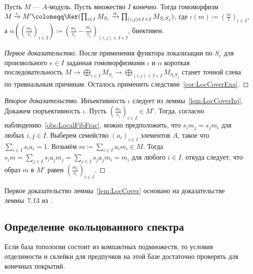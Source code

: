 \documentclass[
	extrafontsizes,
	11pt,
	hyphens,
]{memoir}
\begin{document}
\begin{lemma} \label{lem:LocCover}
Пусть \(M\) --- \(A\)-мо\-дуль.
Пусть множество \(I\) конечно.
Тогда гомоморфизм
\(
M \xrightarrow{\iota}
M' \coloneqq
\Ker(
\prod_{i \in I} M_{S_i}
\xrightarrow{\alpha}
\prod_{(i,j) \in I \times I}
M_{S_i S_j})
\),
где \(\iota(m) \coloneqq (\frac{m}{1})_{i \in I}\), а
\(\alpha((\frac{m_i}{s_i})_{i \in I}) \coloneqq (\frac{m_i}{s_i} - \frac{m_j}{s_j})_{(i,j) \in I \times I}\),
биективен.
\end{lemma}

\begin{proof}[Первое доказательство]
После применения функтора локализации по \(S_e\) для произвольного \(e \in I\) заданная гомоморфизмами \(\iota\) и \(\alpha\) короткая последовательность
\(
M \to
\bigoplus_{i \in I} M_{S_i}
\to
\bigoplus_{(i,j) \in I \times I}
M_{S_i S_j}
\)
станет точной слева по тривиальным причинам. Осталось применить следствие~\ref{cor:LocCoverExa}.
\end{proof}

\begin{proof}[Второе доказательство]
Инъективность \(\iota\) следует из леммы~\ref{lem:LocCoverInj}.
Докажем сюръективность \(\iota\).
Пусть
\((\frac{m_i}{s_i})_{i \in I} \in M'\).
Тогда, согласно наблюдению~\ref{obs:LocalFibFrac}, можно предположить, что \(s_i m_j = s_j m_i\) для любых \(i, j \in I\).
Выберем семейство \((a_i)_{i \in I}\) элементов \(A\), такое что \(\sum_{i \in I} s_i a_i = 1\).
Возьмём \(m \coloneqq \sum_{i \in I} a_i m_i \in M\).
Тогда \(s_i m = \sum_{j \in I} s_i a_j m_j = \sum_{j \in I} s_j a_j m_i = m_i\) для любого \(i \in I\), откуда следует, что образ \(m\) в \(M'\) равен \((\frac{m_i}{s_i})_{i \in I}\).
\end{proof}

\begin{remark}
Первое доказательство леммы~\ref{lem:LocCover} основано на доказательстве леммы~7.13 из \cite[][лекция~7]{Kaledin_AG}.
\end{remark}

\subsection{Определение окольцованного спектра}

\begin{observation} \label{obs:SheafOnACompactBase}
Если база топологии состоит из компактных подмножеств, то условия отделимости и склейки для предпучков на этой базе достаточно проверять для конечных покрытий.
\end{observation}
\end{document}
